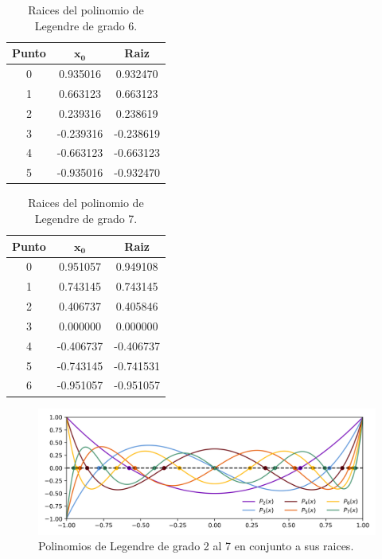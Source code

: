 \begin{minipage}{7.5cm}
    \vspace{0.65cm}
    \begin{table}[H]
        \centering
        \begin{tabular}{ccc}\hline
            \textbf{Punto} & $\mathbf{x_0}$ & \textbf{Raiz} \\ \hline
            0              & 0.935016       & 0.932470      \\
            1              & 0.663123       & 0.663123      \\
            2              & 0.239316       & 0.238619      \\
            3              & -0.239316      & -0.238619     \\
            4              & -0.663123      & -0.663123     \\
            5              & -0.935016      & -0.932470     \\ \hline
        \end{tabular}
        \caption{Raices del polinomio de Legendre de grado 6.}
        \label{table:problema2_6}
    \end{table}
\end{minipage}
\hspace{1cm}
\begin{minipage}{7.5cm}
    \begin{table}[H]
        \centering
        \begin{tabular}{ccc} \hline
            \textbf{Punto} & $\mathbf{x_0}$ & \textbf{Raiz} \\ \hline
            0              & 0.951057       & 0.949108      \\
            1              & 0.743145       & 0.743145      \\
            2              & 0.406737       & 0.405846      \\
            3              & 0.000000       & 0.000000      \\
            4              & -0.406737      & -0.406737     \\
            5              & -0.743145      & -0.741531     \\
            6              & -0.951057      & -0.951057     \\  \hline
        \end{tabular}
        \caption{Raices del polinomio de Legendre de grado 7.}
        \label{table:problema2_7}
    \end{table}
\end{minipage}

\begin{figure}[H]
    \centering
    \includegraphics[width=16cm]{Graphics/problema2.png}
    \caption{Polinomios de Legendre de grado 2 al 7 en conjunto a sus raices.}
    \label{fig:problema2}
\end{figure}